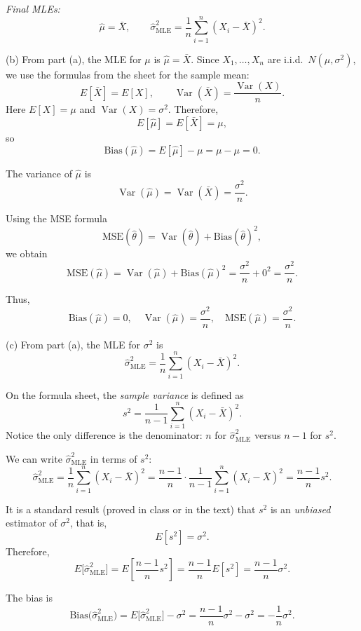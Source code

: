 \documentclass[11pt,letterpaper]{article}
\theoremstyle{remark}
\begin{document}
\textit{Final MLEs:}
\[
\boxed{\hat{\mu} = \bar{X}},
\qquad
\boxed{\hat{\sigma}^2_{\mathrm{MLE}}
= \frac{1}{n}\sum_{i=1}^n (X_i - \bar{X})^2}.
\]

\vspace{1cm}

(b) From part (a), the MLE for $\mu$ is $\hat{\mu} = \bar{X}$. Since $X_1,\dots,X_n$ are i.i.d.\ $N(\mu,\sigma^2)$, we use the formulas from the sheet for the sample mean:
\[
E[\bar{X}] = E[X], \qquad \operatorname{Var}(\bar{X}) = \frac{\operatorname{Var}(X)}{n}.
\]
Here $E[X] = \mu$ and $\operatorname{Var}(X) = \sigma^2$. Therefore,
\[
E[\hat{\mu}] = E[\bar{X}] = \mu,
\]
so
\[
\text{Bias}(\hat{\mu}) = E[\hat{\mu}] - \mu = \mu - \mu = 0.
\]

The variance of $\hat{\mu}$ is
\[
\operatorname{Var}(\hat{\mu}) = \operatorname{Var}(\bar{X}) = \frac{\sigma^2}{n}.
\]

Using the MSE formula
\[
\mathrm{MSE}(\hat{\theta}) = \operatorname{Var}(\hat{\theta}) + \text{Bias}(\hat{\theta})^2,
\]
we obtain
\[
\mathrm{MSE}(\hat{\mu})
= \operatorname{Var}(\hat{\mu}) + \text{Bias}(\hat{\mu})^2
= \frac{\sigma^2}{n} + 0^2
= \frac{\sigma^2}{n}.
\]

Thus,
\[
\boxed{\text{Bias}(\hat{\mu}) = 0, \quad
       \operatorname{Var}(\hat{\mu}) = \frac{\sigma^2}{n}, \quad
       \mathrm{MSE}(\hat{\mu}) = \frac{\sigma^2}{n}.}
\]

\vspace{1cm}

(c) From part (a), the MLE for $\sigma^2$ is
\[
\hat{\sigma}^2_{\mathrm{MLE}} = \frac{1}{n}\sum_{i=1}^n (X_i - \bar{X})^2.
\]

On the formula sheet, the \emph{sample variance} is defined as
\[
s^2 = \frac{1}{n-1}\sum_{i=1}^n (X_i - \bar{X})^2.
\]
Notice the only difference is the denominator: $n$ for $\hat{\sigma}^2_{\mathrm{MLE}}$ versus $n-1$ for $s^2$.

We can write $\hat{\sigma}^2_{\mathrm{MLE}}$ in terms of $s^2$:
\[
\hat{\sigma}^2_{\mathrm{MLE}}
= \frac{1}{n}\sum_{i=1}^n (X_i - \bar{X})^2
= \frac{n-1}{n} \cdot \frac{1}{n-1}\sum_{i=1}^n (X_i - \bar{X})^2
= \frac{n-1}{n} s^2.
\]

It is a standard result (proved in class or in the text) that $s^2$ is an \emph{unbiased} estimator of $\sigma^2$, that is,
\[
E[s^2] = \sigma^2.
\]
Therefore,
\[
E\bigl[\hat{\sigma}^2_{\mathrm{MLE}}\bigr]
= E\left[\frac{n-1}{n}s^2\right]
= \frac{n-1}{n}E[s^2]
= \frac{n-1}{n}\sigma^2.
\]

The bias is
\[
\text{Bias}\bigl(\hat{\sigma}^2_{\mathrm{MLE}}\bigr)
= E\bigl[\hat{\sigma}^2_{\mathrm{MLE}}\bigr] - \sigma^2
= \frac{n-1}{n}\sigma^2 - \sigma^2
= -\frac{1}{n}\sigma^2.
\]
\end{document}
